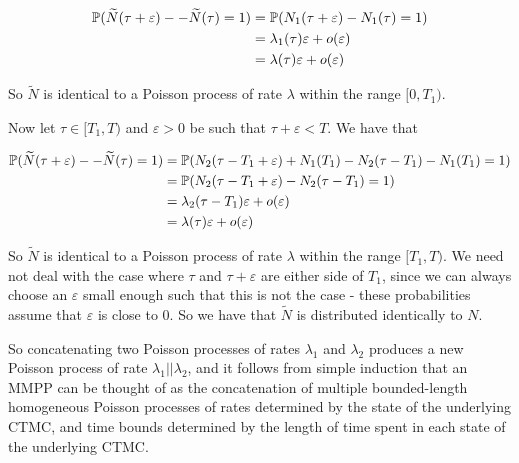 \begin{align*}
\mathbb{P} (\widetilde{N}(\tau+\varepsilon) -- \widetilde{N}(\tau) = 1)
	&= \mathbb{P} (N_1(\tau+\varepsilon) - N_1(\tau) = 1) \\
	&= \lambda_1(\tau)\varepsilon + o(\varepsilon) \\
	&= \lambda(\tau)\varepsilon + o(\varepsilon)
\end{align*} 

So $\widetilde{N}$ is identical to a Poisson process of rate $\lambda$ within the range $[0,T_1)$.

Now let $\tau \in [T_1,T)$ and $\varepsilon>0$ be such that $\tau + \varepsilon < T$. We have that

\begin{align*}
\mathbb{P} (\widetilde{N}(\tau+\varepsilon) -- \widetilde{N}(\tau) = 1)
	&= \mathbb{P} (N_2(\tau-T_1+\varepsilon) + N_1(T_1) - N_2(\tau-T_1) - N_1(T_1)= 1)\\
	&= \mathbb{P} (N_2(\tau-T_1+\varepsilon) - N_2(\tau-T_1) = 1)\\
	&= \lambda_2(\tau-T_1)\varepsilon + o(\varepsilon) \\
	&= \lambda(\tau)\varepsilon + o(\varepsilon)
\end{align*}

So $\widetilde{N}$ is identical to a Poisson process of rate $\lambda$ within the range $[T_1,T)$. We need not deal with the case where $\tau$ and $\tau+\varepsilon$ are either side of $T_1$, since we can always choose an $\varepsilon$ small enough such that this is not the case - these probabilities assume that $\varepsilon$ is close to 0. So we have that $\widetilde{N}$ is distributed identically to $N$.

So concatenating two Poisson processes of rates $\lambda_1$ and $\lambda_2$ produces a new Poisson process of rate $\lambda_1||\lambda_2$, and it follows from simple induction that an MMPP can be thought of as the concatenation of multiple bounded-length homogeneous Poisson processes of rates determined by the state of the underlying CTMC, and time bounds determined by the length of time spent in each state of the underlying CTMC.
